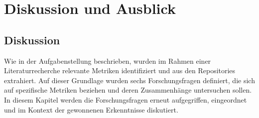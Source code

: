 


\chapter{Diskussion und Ausblick} %

\label{Chapter5} %


\section{Diskussion}

Wie in der Aufgabenstellung beschrieben, wurden im Rahmen einer Literaturrecherche relevante Metriken identifiziert und aus den Repositories extrahiert. Auf dieser Grundlage wurden sechs Forschungsfragen definiert, die sich auf spezifische Metriken beziehen und deren Zusammenhänge untersuchen sollen. In diesem Kapitel werden die Forschungsfragen erneut aufgegriffen, eingeordnet und im Kontext der gewonnenen Erkenntnisse diskutiert.


